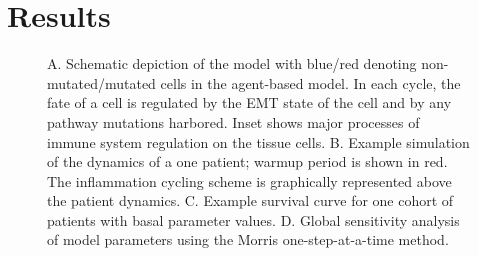 \documentclass[11pt, a4paper, preprint]{article}
\begin{document}

\section{Results}

\begin{figure}[H]
\center
{}
\caption{A. Schematic depiction of the model with blue/red denoting non-mutated/mutated cells in the agent-based model. In each cycle, the fate of a cell is regulated by the EMT state of the cell and by any pathway mutations harbored. Inset shows major processes of immune system regulation on the tissue cells.
B. Example simulation of the dynamics of a one patient; warmup period is shown in red.
The inflammation cycling scheme is graphically represented above the patient dynamics.
C. Example survival curve for one cohort of patients with basal parameter values.
D. Global sensitivity analysis of model parameters using the Morris one-step-at-a-time method.}
\label{fig:ModelIntro}
\end{figure}
\end{document}
